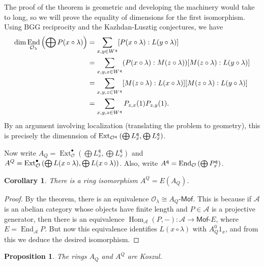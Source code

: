 \documentclass{amsart}
\newtheorem{cor}[thm]{Corollary}
\newtheorem{prop}[thm]{Proposition}
\theoremstyle{definition}
\theoremstyle{remark}
\theoremstyle{plain}
\theoremstyle{definition}
\theoremstyle{remark}
\newcommand{\cO}{\mathcal{O}}
\newcommand{\mc}[1]{\mathcal{#1}}
\newcommand{\mf}[1]{\mathfrak{#1}}
\newcommand{\ms}[1]{\mathsf{#1}}
\DeclareMathOperator{\Hom}{Hom}
\DeclareMathOperator{\End}{End}
\DeclareMathOperator{\Ext}{Ext}
\begin{document}
The proof of the theorem is geometric and developing the machinery would take to long, so we will prove the equality of dimensions for the first isomorphism. Using BGG reciprocity and the Kazhdan-Lusztig conjectures, we have
\begin{align*}
    \dim \End_{\cO_{\lambda}}\qty(\bigoplus P(x \circ \lambda)) &= \sum_{x, y \in W^{\mf{q}}} [P(x \circ \lambda) : L(y \circ \lambda)] \\
    &= \sum_{x, y, z \in W^{\mf{q}}} (P(x \circ \lambda) : M(z \circ \lambda)) [M(z \circ \lambda) : L(y \circ \lambda)] \\
    &= \sum_{x,y,z \in W^{\mf{q}}} [M(z \circ \lambda):L(x \circ \lambda)][M(z \circ \lambda) : L(y \circ \lambda)] \\
    &= \sum_{x,y,z \in W^{\mf{q}}} P_{z,x}(1)P_{z,y}(1).
\end{align*}
By an argument involving localization (translating the problem to geometry), this is precisely the dimennsion of $\Ext_{\cO^{\mf{q}}}\qty(\bigoplus L_x^{\mf{q}}, \bigoplus L_x^{\mf{q}})$.

Now write $A_{Q} = \Ext_{\cO}^{\bullet}(\bigoplus L_x^{\mf{q}}, \bigoplus L_x^{\mf{q}})$ and $A^{Q} = \Ext_{\cO}^{\bullet}\qty(\bigoplus L(x \circ \lambda), \bigoplus L(x \circ \lambda))$. Also, write $A^{\mf{q}} = \End_{\cO}\qty(\bigoplus P_x^{\mf{q}})$.
\begin{cor}
    There is a ring isomorphism $A^{Q} = E(A_{Q})$.
\end{cor}

\begin{proof}
    By the theorem, there is an equivalence $\cO_{\lambda} \cong A_{Q}\text{-}\ms{Mof}$. This is because if $\mc{A}$ is an abelian category whose objects have finite length and $P \in \mc{A}$ is a projective generator, then there is an equivalence $\Hom_{\mc{A}}(P,-) \colon \mc{A} \to \ms{Mof}\text{-}E$, where $E = \End_{\mc{A}} P$. But now this equivalence identifies $L(x \circ \lambda)$ with $A_{Q}^0 1_x$, and from this we deduce the desired isomorphism.
\end{proof}

\begin{prop}
    The rings $A_{Q}$ and $A^{Q}$ are Koszul.
\end{prop}
\end{document}
